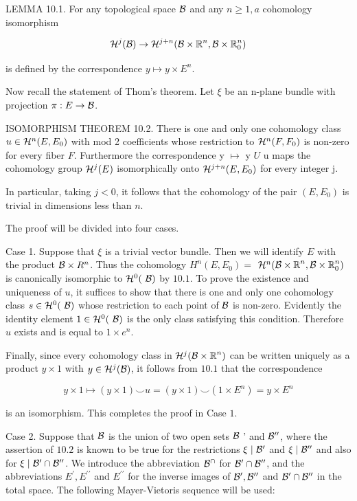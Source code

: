 LEMMA 10.1. For any topological space $\mathcal{B}$ and any $ n  \geq 1, a$ cohomology isomorphism

\[
\mathcal{H}^{j}(\mathcal{B}) \rightarrow \mathcal{H}^{j+ n }(\mathcal{B} \times \boldsymbol{\mathbb{R}}^{ n }, \mathcal{B} \times \boldsymbol{\mathbb{R}}_{0}^{ n })
\]

is defined by the correspondence $ y  \mapsto  y  \times E^{ n }$.

Now recall the statement of Thom's theorem. Let $\xi$ be an n-plane bundle with projection $\pi: E \rightarrow \mathcal{B}$.

ISOMORPHISM THEOREM 10.2. There is one and only one cohomology class $u \in  \mathcal{H}^{ n }(E, E_{0})$ with mod 2 coefficients whose restriction to $\mathcal{H}^{ n }(F, F_{0})$ is non-zero for every fiber $F$. Furthermore the correspondence y $\mapsto$ y $U$ u maps the cohomology group $\mathcal{H}^{j}(E)$ isomorphically onto $\mathcal{H}^{j+ n }(E, E_{0})$ for every integer j.

In particular, taking $j<0$, it follows that the cohomology of the pair $(E, E_{0})$ is trivial in dimensions less than $n$.

The proof will be divided into four cases.

Case 1. Suppose that $\xi$ is a trivial vector bundle. Then we will identify $E$ with the product $\mathcal{B} \times R^{n}$. Thus the cohomology $H^{n}(E, E_{0})=$ $\mathcal{H}^{ n }(\mathcal{B} \times \boldsymbol{\mathbb{R}}^{ n }, \mathcal{B} \times \boldsymbol{\mathbb{R}}_{0}^{ n })$ is canonically isomorphic to $\mathcal{H}^{0}(\mathrm{~\mathcal{B}})$ by $10.1$. To prove the existence and uniqueness of $u$, it suffices to show that there is one and only one cohomology class $s \in \mathcal{H}^{0}(\mathrm{~\mathcal{B}})$ whose restriction to each point of $\mathcal{B}$ is non-zero. Evidently the identity element $1 \in \mathcal{H}^{0}(\mathrm{~\mathcal{B}})$ is the only class satisfying this condition. Therefore $u$ exists and is equal to $1 \times e^{n}$.

Finally, since every cohomology class in $\mathcal{H}^{j}(\mathcal{B} \times \boldsymbol{\mathbb{R}}^{ n })$ can be written uniquely as a product $ y  \times 1$ with $ y  \in \mathcal{H}^{j}(\mathcal{B})$, it follows from $10.1$ that the correspondence

\[
 y  \times 1 \mapsto( y  \times 1) \smile u=( y  \times 1) \smile(1 \times E^{ n })= y  \times E^{ n }
\]

is an isomorphism. This completes the proof in Case $1$.

Case 2. Suppose that $\mathcal{B}$ is the union of two open sets $\mathcal{B}$ ' and $\mathcal{B}^{\prime \prime}$, where the assertion of $10.2$ is known to be true for the restrictions $\xi \mid \mathcal{B}^{\prime}$ and $\xi \mid \mathcal{B}^{\prime \prime}$ and also for $\xi \mid \mathcal{B}^{\prime} \cap \mathcal{B}^{\prime \prime}$. We introduce the abbreviation $\mathcal{B}^{\cap}$ for $\mathcal{B}^{\prime} \cap \mathcal{B}^{\prime \prime}$, and the abbreviations $E^{\prime}, E^{\prime \prime}$ and $E^{\prime \prime}$ for the inverse images of $\mathcal{B}^{\prime}, \mathcal{B}^{\prime \prime}$ and $\mathcal{B}^{\prime} \cap \mathcal{B}^{\prime \prime}$ in the total space. The following Mayer-Vietoris sequence will be used:

